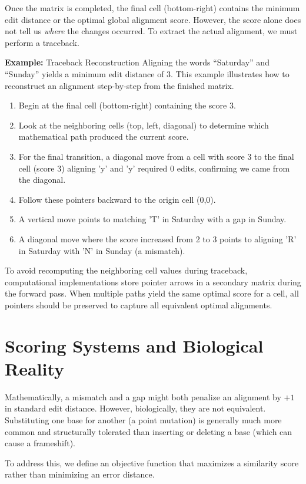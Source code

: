 Once the matrix is completed, the final cell (bottom-right) contains the minimum edit distance or the optimal global alignment score. However, the score alone does not tell us \textit{where} the changes occurred. To extract the actual alignment, we must perform a traceback.

\textbf{Example:} Traceback Reconstruction
Aligning the words ``Saturday'' and ``Sunday'' yields a minimum edit distance of 3.
This example illustrates how to reconstruct an alignment step-by-step from the finished matrix.
\begin{enumerate}
    \item Begin at the final cell (bottom-right) containing the score 3.
    \item Look at the neighboring cells (top, left, diagonal) to determine which mathematical path produced the current score.
    \item For the final transition, a diagonal move from a cell with score 3 to the final cell (score 3) aligning 'y' and 'y' required 0 edits, confirming we came from the diagonal.
    \item Follow these pointers backward to the origin cell (0,0).
    \item A vertical move points to matching 'T' in Saturday with a gap in Sunday.
    \item A diagonal move where the score increased from 2 to 3 points to aligning 'R' in Saturday with 'N' in Sunday (a mismatch).
\end{enumerate}

To avoid recomputing the neighboring cell values during traceback, computational implementations store pointer arrows in a secondary matrix during the forward pass. \sta When multiple paths yield the same optimal score for a cell, all pointers should be preserved to capture all equivalent optimal alignments. 

\section{Scoring Systems and Biological Reality}

Mathematically, a mismatch and a gap might both penalize an alignment by $+1$ in standard edit distance. However, biologically, they are not equivalent. Substituting one base for another (a point mutation) is generally much more common and structurally tolerated than inserting or deleting a base (which can cause a frameshift). 

To address this, we define an objective function that maximizes a similarity score rather than minimizing an error distance. 

